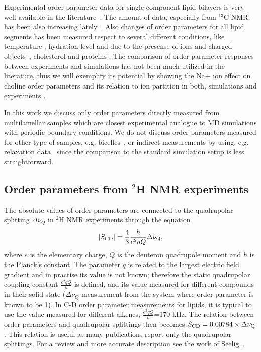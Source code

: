 \documentclass[aps,prl,superscriptaddress,twocolumn]{revtex4}
\begin{document}
Experimental order parameter data for single component lipid bilayers is very 
well available in the literature~\cite{castro07,castro08,leftin11,marsh13,ferreira13,leftin13,leftin14,botan15}. 
The amount of data, especially from $^{13}$C NMR, has been also increasing lately~\cite{castro07,castro08,ferreira13,leftin13,leftin14}.
Also changes of order parameters for all lipid segments has been measured respect to several
different conditions, like temperature \cite{??}, hydration level \cite{bechinger91,ulrich94,mallikarjunaiah11,dvinskikh05a} and
due to the presense of ions and charged objects~\cite{akutsu81,altenbach84,seelig87,scherer89}, 
cholesterol \cite{brown78,douliez95,ferreira13,leftin14} and proteins \cite{kuchinka89,roux90,leftin13}.
The comparison of order parameter responses between experiments and simulations
has not been much utilized in the literature, thus we will exemplify its potential by showing
the Na$ +$ ion effect on choline order parameters and its relation to ion partition in both, 
simulations \cite{ionpaper} and experiments \cite{akutsu81,altenbach84,seelig87,scherer89}.

In this work we discuss only order parameters directly measured from multilamellar samples 
which are closest experimental analogue to MD simulations with periodic boundary conditions. 
We do not discuss order parameters measured for other type of samples, 
e.g. bicelles~\cite{aussenac03,raffard00,sanders92}, or indirect measurements by using, e.g. relaxation
data~\cite{marbella15} since the comparison to the standard simulation setup is less straightforward.  


 

\subsection{Order parameters from $^2$H NMR experiments}\label{DopSECTION}

The absolute values of order parameters are connected to the quadrupolar splitting $\Delta \nu_Q$ 
in $^2$H NMR experiments through the equation 
\begin{equation}\label{HNMRop}
|S_{{\rm CD}}|=\frac{4}{3} \frac{h}{e^2qQ} \Delta \nu_{{\rm Q}}, 
\end{equation}
where $e$ is the elementary charge, $Q$ is the deuteron quadrupole moment and $h$ is the Planck's constant. 
The parameter $q$ is related to the largest electric field gradient and in practise its value is not known; 
therefore the static quadrupolar coupling constant $\frac{e^2qQ}{h}$ is defined, and its value measured for 
different compounds in their solid state ($\Delta \nu_Q$ measurement from the system where order parameter is known to be 1). 
In C-D order parameter measurements for lipids, it is typical to 
use the value measured for different alkenes, $\frac{e^2qQ}{h}$=170 kHz. The relation between order parameters 
and quadrupolar splittings then becomes $S_{{\rm CD}}=0.00784 \times \Delta \nu_{{\rm Q}}$.
This relation is useful as many publications report only the quadrupolar splittings. For a review and more accurate description see the work of Seelig~\cite{seelig77c}.
\end{document}

